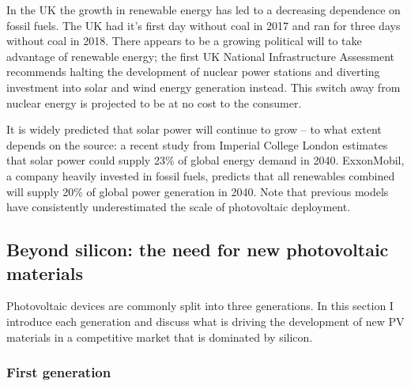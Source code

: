 In the UK the growth in renewable energy has led to a decreasing dependence on fossil fuels. The UK had it's first day without coal in 2017\autocite{Brown2017} and ran for three days without coal in 2018.\autocite{Vaughan2018} There appears to be a growing political will to take advantage of renewable energy; the first UK National Infrastructure Assessment recommends halting the development of nuclear power stations and diverting investment into solar and wind energy generation instead.\autocite{NIA2018} This switch away from nuclear energy is projected to be at no cost to the consumer.

It is widely predicted that solar power will continue to grow -- to what extent depends on the source: a recent study from Imperial College London estimates that solar power could supply 23\% of global energy demand in 2040.\autocite{Grantham2017} ExxonMobil, a company heavily invested in fossil fuels, predicts that all renewables combined will supply 20\% of global power generation in 2040.\autocite{exxon2018} Note that previous models have consistently underestimated the scale of photovoltaic deployment.\autocite{Creutzig2017}

\subsection{Beyond silicon: the need for new photovoltaic materials}

Photovoltaic devices are commonly split into three generations. In this section I introduce each generation and discuss what is driving the development of new PV materials in a competitive market that is dominated by silicon.

\subsubsection{First generation}

